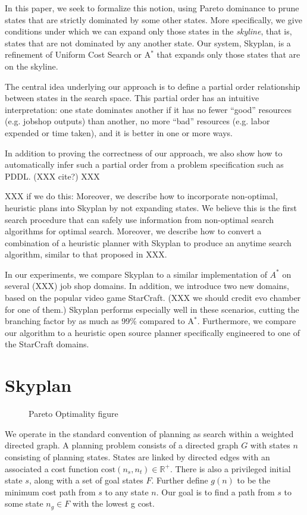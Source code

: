 \documentclass[letterpaper]{article}
\theoremstyle{plain} \newtheorem{theorem}{Theorem} \newtheorem{proposition}{Proposition} \newtheorem{lemma}{Lemma}
\theoremstyle{definition} \newtheorem{definition}{Definition} \newtheorem{conjecture}{Conjecture} \newtheorem*{example}{Example}
\theoremstyle{remark} \newtheorem*{remark}{Remark} \newtheorem*{note}{Note} \newtheorem{case}{Case}
\begin{document}
In this paper, we seek to formalize this notion, using Pareto
dominance to prune states that are strictly dominated by some other
states. More specifically, we give conditions under which we can
expand only those states in the \textit{skyline}, that is, states
that are not dominated by any another state. Our system, Skyplan,
is a refinement of Uniform Cost Search or A$^*$ that expands only
those states that are on the skyline.

The central idea underlying our approach is to define a partial
order relationship between states in the search space. This partial
order has an intuitive interpretation: one state dominates another
if it has no fewer ``good'' resources (e.g. jobshop outputs) than
another, no more ``bad'' resources (e.g. labor expended or time
taken), and it is better in one or more ways. 

In addition to proving the correctness of our approach, we also show 
how to automatically infer such a partial order from a problem
specification such as PDDL. (XXX cite?)  XXX


XXX if we do this:
Moreover, we describe how to incorporate non-optimal, heuristic
plans into Skyplan by not expanding states.  We believe this is the
first search procedure that can safely use information from non-optimal
search algorithms for optimal search. Moreover, we describe how to
convert a combination of a heuristic planner with Skyplan to produce
an anytime search algorithm, similar to that proposed in XXX.

In our experiments, we compare Skyplan to a similar implementation
of $A^*$ on several (XXX) job shop domains. In addition, we introduce
two new domains, based on the popular video game StarCraft. (XXX
we should credit evo chamber for one of them.) Skyplan performs
especially well in these scenarios, cutting the branching factor
by as much as 99\% compared to A$^*$.  Furthermore, we compare our
algorithm to a heuristic open source planner specifically engineered
to one of the StarCraft domains.

\section{Skyplan}

\begin{figure}
  \caption{Pareto Optimality figure}
\end{figure}

We operate in the standard convention of planning as search within
a weighted directed graph.  A planning problem consists of a directed
graph $G$ with states $n$ consisting of planning states.  States are
linked by directed edges with an associated a cost function
$\mathrm{cost}(n_s,n_t) \in \mathbb R^+$.  There is also a privileged
initial state $s$, along with a set of goal states $F$.  Further
define $g(n)$ to be the minimum cost path from $s$ to any state $n$.
Our goal is to find a path from $s$ to some state $n_g \in F$ with
the lowest g cost.
\end{document}

